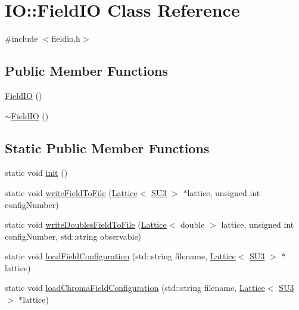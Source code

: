\hypertarget{class_i_o_1_1_field_i_o}{}\section{IO\+::Field\+IO Class Reference}
\label{class_i_o_1_1_field_i_o}


{\ttfamily \#include $<$fieldio.\+h$>$}

\subsection*{Public Member Functions}
\begin{DoxyCompactItemize}
\item 
\mbox{\hyperlink{class_i_o_1_1_field_i_o_ae07d1c91bc341be3d295e77e420b1c9b}{Field\+IO}} ()
\item 
\mbox{\hyperlink{class_i_o_1_1_field_i_o_a48f5f4f12c445e98607b1e44db6d4ad1}{$\sim$\+Field\+IO}} ()
\end{DoxyCompactItemize}
\subsection*{Static Public Member Functions}
\begin{DoxyCompactItemize}
\item 
static void \mbox{\hyperlink{class_i_o_1_1_field_i_o_ae01182be89137153bf043f9a34258601}{init}} ()
\item 
static void \mbox{\hyperlink{class_i_o_1_1_field_i_o_a44dc4aa1786974c091082c5b37be73a1}{write\+Field\+To\+File}} (\mbox{\hyperlink{class_lattice}{Lattice}}$<$ \mbox{\hyperlink{class_s_u3}{S\+U3}} $>$ $\ast$lattice, unsigned int config\+Number)
\item 
static void \mbox{\hyperlink{class_i_o_1_1_field_i_o_a4bfe0fd7890fe69b88fbbe3864fd00ae}{write\+Doubles\+Field\+To\+File}} (\mbox{\hyperlink{class_lattice}{Lattice}}$<$ double $>$ lattice, unsigned int config\+Number, std\+::string observable)
\item 
static void \mbox{\hyperlink{class_i_o_1_1_field_i_o_afdd7f357ed71f7ff3ab1b5be987a51b5}{load\+Field\+Configuration}} (std\+::string filename, \mbox{\hyperlink{class_lattice}{Lattice}}$<$ \mbox{\hyperlink{class_s_u3}{S\+U3}} $>$ $\ast$lattice)
\item 
static void \mbox{\hyperlink{class_i_o_1_1_field_i_o_a8d6ea988658b107eca71c858d3816c99}{load\+Chroma\+Field\+Configuration}} (std\+::string filename, \mbox{\hyperlink{class_lattice}{Lattice}}$<$ \mbox{\hyperlink{class_s_u3}{S\+U3}} $>$ $\ast$lattice)
\end{DoxyCompactItemize}


